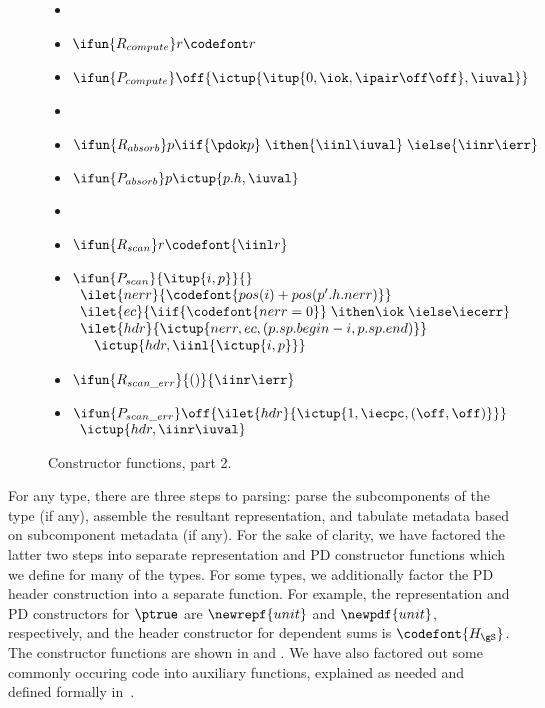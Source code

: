 \begin{figure}
\begin{itemize}
\item[] %
\item[] $\ifun{R_{compute}} r {\codefont r}$
\item[] $\ifun{P_{compute}} \off {\ictup{\itup{0,\iok,\ipair \off \off},\iuval}}$

\item[] %
\item[] $\ifun {R_{absorb}} p {\iif {\pdok p}\; 
    \ithen {\iinl \iuval}\; \ielse {\iinr \ierr}}$
\item[] $\ifun {P_{absorb}} p {\ictup{p.h,\iuval}}$

\item[] %
\item[] $\ifun{R_{scan}} r  {\codefont{\iinl r}}$
\item[] $\ifun{P_{scan}} {\itup{i,p}} {}$ \\
$\begin{array}{l}
\ilet {nerr} {\codefont{pos(i) + pos(p'.h.nerr)}}\\
\ilet {ec} {\iif {\codefont{nerr = 0}}\; \ithen \iok\; \ielse \iecerr} \\
\ilet {hdr} {\ictup{nerr,ec,(p.sp.begin - i,p.sp.end)}} \\
\quad \ictup{hdr,\iinl {\ictup{i,p}}}
\end{array}$

\item[] $\ifun {R_{scan\_err}} {()} {\iinr \ierr}$
\item[] $\ifun {P_{scan\_err}} \off {\ilet {hdr} {\ictup{1,\iecpc,(\off,\off)}}}$\\
  \verb+ +$\ictup{hdr,\iinr \iuval}$
\end{itemize}
\caption{Constructor functions, part 2.}
\label{fig:cons-funs-cont}
\end{figure}

For any type, there are three steps to parsing: parse the
subcomponents of the type (if any), assemble the resultant
representation, and tabulate metadata based on subcomponent metadata
(if any). For the sake of clarity, we have factored the latter two
steps into separate representation and PD constructor functions which
we define for many of the types. For some types, we additionally factor the PD
header construction into a separate function. For example, the
representation and PD constructors for $\ptrue$ are $\newrepf {unit}$
and $\newpdf {unit}$, respectively, and the header constructor for
dependent sums is ${\codefont{H_{\gS}}}$. The constructor functions are shown in
 and . We have also
factored out some commonly occuring code into auxiliary functions,
explained as needed and defined formally in~.

